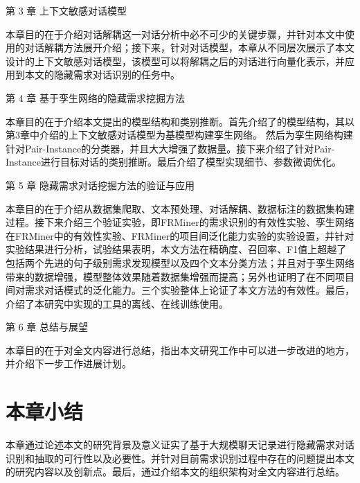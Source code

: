 第 3 章 上下文敏感对话模型

本章目的在于介绍对话解耦这一对话分析中必不可少的关键步骤，并针对本文中使用的对话解耦方法展开介绍；接下来，针对对话模型，本章从不同层次展示了本文设计的上下文敏感对话模型{\dm}，该模型可以将解耦之后的对话进行向量化表示，并应用到本文的隐藏需求对话识别的任务中。


第 4 章 基于孪生网络的隐藏需求挖掘方法

本章目的在于介绍本文提出的{\tool}模型结构和类别推断。首先介绍了{\tool}的模型结构，其以第3章中介绍的上下文敏感对话模型{\dm}为基模型构建孪生网络。
然后为孪生网络构建针对Pair-Instance的分类器，并且大大增强了数据量。接下来介绍了针对Pair-Instance进行目标对话的类别推断。最后介绍了模型实现细节、参数微调优化。



第 5 章 隐藏需求对话挖掘方法的验证与应用

本章目的在于介绍从数据集爬取、文本预处理、对话解耦、数据标注的数据集构建过程。接下来介绍三个验证实验，即FRMiner的需求识别的有效性实验、孪生网络在FRMiner中的有效性实验、FRMiner的项目间泛化能力实验的实验设置，并针对实验结果进行分析，试验结果表明，本文方法在精确度、召回率、F1值上超越了包括两个先进的句子级别需求发现模型以及四个文本分类方法；并且对于孪生网络带来的数据增强，模型整体效果随着数据集增强而提高；另外也证明了{\tool}在不同项目间对需求对话模式的泛化能力。三个实验整体上论证了本文方法的有效性。最后，介绍了本研究中实现的{\tool}工具的离线、在线训练使用。

第 6 章 总结与展望

本章目的在于对全文内容进行总结，指出本文研究工作中可以进一步改进的地方，并介绍下一步工作进展计划。 


\section{本章小结}

本章通过论述本文的研究背景及意义证实了基于大规模聊天记录进行隐藏需求对话识别和抽取的可行性以及必要性。并针对目前需求识别过程中存在的问题提出本文的研究内容以及创新点。最后，通过介绍本文的组织架构对全文内容进行总结。 